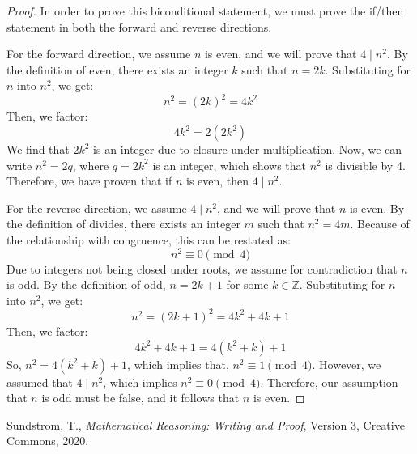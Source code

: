 \documentclass[12pt]{article}
\theoremstyle{definition}
\begin{document}
\begin{proof}
    In order to prove this biconditional statement, we must prove the if/then statement in both the forward and reverse directions.

    \vspace{1em}

    For the forward direction, we assume \( n \) is even, and we will prove that \( 4 \mid n^2 \). By the definition of even, there exists an integer \( k \) such that \( n = 2k \). Substituting for \( n \) into \( n^2 \), we get:
    \[ n^2 = (2k)^2 = 4k^2 \]
    Then, we factor:
    \[ 4k^2 = 2(2k^2) \]
    We find that \( 2k^2 \) is an integer due to closure under multiplication. Now, we can write \( n^2 = 2q \), where \( q = 2k^2 \) is an integer, which shows that \( n^2 \) is divisible by 4. Therefore, we have proven that if \( n \) is even, then \( 4 \mid n^2 \).

    \vspace{1em}

    For the reverse direction, we assume \( 4 \mid n^2 \), and we will prove that \( n \) is even. By the definition of divides, there exists an integer \( m \) such that \( n^2 = 4m \). Because of the relationship with congruence, this can be restated as:
    \[ n^2 \equiv 0 \pmod{4} \]
    Due to integers not being closed under roots, we assume for contradiction that \( n \) is odd. By the definition of odd, \( n = 2k + 1 \) for some \( k \in \mathbb{Z} \). Substituting for \( n \) into \( n^2 \), we get:
    \[ n^2 = (2k + 1)^2 = 4k^2 + 4k + 1 \]
    Then, we factor:
    \[ 4k^2 + 4k + 1 = 4(k^2 + k) + 1 \]
    So, \( n^2 = 4(k^2 + k) + 1 \), which implies that, \( n^2 \equiv 1 \pmod{4} \). However, we assumed that \( 4 \mid n^2 \), which implies \( n^2 \equiv 0 \pmod{4} \). Therefore, our assumption that \( n \) is odd must be false, and it follows that \( n \) is even.
\end{proof}

\vspace{1em}
\begin{thebibliography}{9}
 Sundstrom, T., \emph{Mathematical Reasoning: Writing and Proof}, Version 3,  Creative Commons, 2020.

\end{thebibliography}

 
\end{document}
